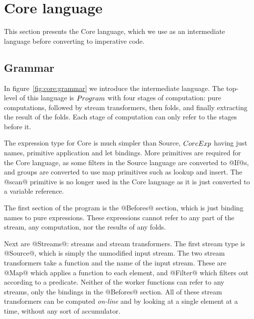 \section{Core language}
\label{s:Core}

This section presents the Core language, which we use as an intermediate language before converting to imperative code.


\subsection{Grammar}




In figure~\ref{fig:core:grammar} we introduce the intermediate language.
The top-level of this language is $\mit{Program}$ with four stages of computation: pure computations, followed by stream transformers, then folds, and finally extracting the result of the folds.
Each stage of computation can only refer to the stages before it.

The expression type for Core is much simpler than Source, $\mit{CoreExp}$ having just names, primitive application and let bindings.
More primitives are required for the Core language, as some filters in the Source language are converted to @If@s, and groups are converted to use map primitives such as lookup and insert.
The @scan@ primitive is no longer used in the Core language as it is just converted to a variable reference.

The first section of the program is the @Befores@ section, which is just binding names to pure expressions.
These expressions cannot refer to any part of the stream, any computation, nor the results of any folds.

Next are @Streams@: streams and stream transformers.
The first stream type is @Source@, which is simply the unmodified input stream.
The two stream transformers take a function and the name of the input stream.
These are @Map@ which applies a function to each element, and @Filter@ which filters out according to a predicate.
Neither of the worker functions can refer to any streams, only the bindings in the @Befores@ section.
All of these stream transformers can be computed \emph{on-line} and by looking at a single element at a time, without any sort of accumulator.

